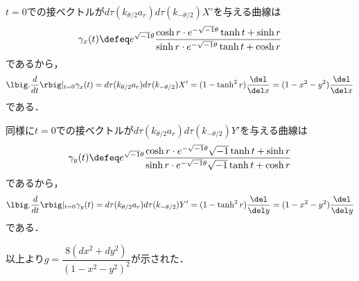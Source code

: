 \begin{npfwn}
  $t = 0$での接ベクトルが$d\tau(k_{\theta/2}a_r)d\tau(k_{-\theta/2})X'$を与える曲線は
  \begin{align*}
    \gamma_x(t) \defeq  e^{\sqrt{-1} \theta}\dfrac{\cosh r\cdot e^{-\sqrt{-1}\theta} \tanh t + \sinh r }{\sinh r\cdot e^{-\sqrt{-1}\theta} \tanh t + \cosh r}
  \end{align*}
  であるから，
  \begin{align*}
    \lbig.\dfrac{d}{dt}\rbig|_{t=0}\gamma_x(t) = d\tau(k_{\theta/2}a_r)d\tau(k_{-\theta/2})X' = (1 - \tanh^2 r)\dfrac{\del}{\del x} = (1-x^2-y^2)\dfrac{\del}{\del x}
  \end{align*}
  である．

  同様に$t = 0$での接ベクトルが$d\tau(k_{\theta/2}a_r)d\tau(k_{-\theta/2})Y'$を与える曲線は
  \begin{align*}
    \gamma_y(t) \defeq  e^{\sqrt{-1} \theta}\dfrac{\cosh r\cdot e^{-\sqrt{-1}\theta}\sqrt{-1} \tanh t + \sinh r }{\sinh r\cdot e^{-\sqrt{-1}\theta}\sqrt{-1} \tanh t + \cosh r}
  \end{align*}
  であるから，
  \begin{align*}
    \lbig.\dfrac{d}{dt}\rbig|_{t=0}\gamma_y(t) = d\tau(k_{\theta/2}a_r)d\tau(k_{-\theta/2})Y' = (1 - \tanh^2 r)\dfrac{\del}{\del y} = (1-x^2-y^2)\dfrac{\del}{\del y}
  \end{align*}
  である．

  以上より$g  =  \dfrac{8(dx^2 + dy^2)}{(1 - x^2 - y^2)^2} $が示された．
\end{npfwn}


